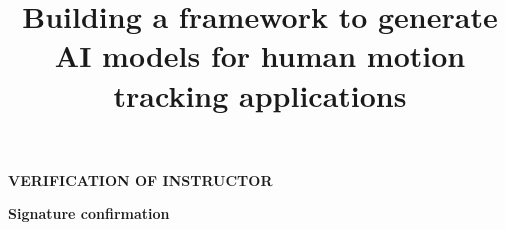 \documentclass[final,oneside]{hcmut-thesis}
\title{Building a framework to generate AI models
for human motion tracking applications}
\begin{document}
\coverpage%

\frontmatter%
\begin{center}
\textbf{\large VERIFICATION OF INSTRUCTOR}
\end{center}

\vspace{15 cm}
\hspace{9 cm} \textbf{\large Signature confirmation}\\
\vspace{3 cm}

%




\tableofcontents
\clearpage
\listoftables
\clearpage
\listoffigures

\mainmatter%







% 
% 



\nocite{*}


% 
% 

\end{document}
